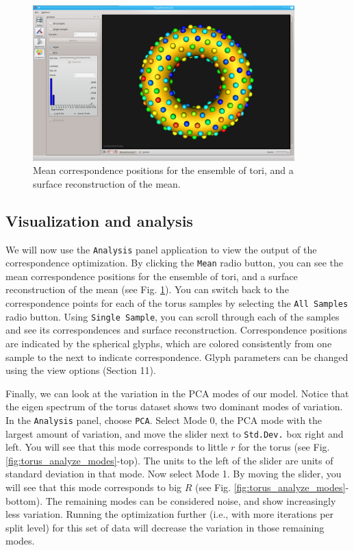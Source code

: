 \documentclass[letterpaper,12pt]{article}   %
\begin{document}
\begin{figure}[!htp]
	\centering
	\includegraphics[width=0.9\textwidth]{figs_v2/torus_analyze_mean.png}
	\caption{ Mean correspondence positions for the ensemble of tori, and a surface reconstruction of the mean. }
	\label{fig:torus_analyze_mean}
\end{figure}


\subsection{Visualization and analysis}

We will now use the \texttt{Analysis} panel application to view the output of the correspondence optimization. By clicking the \texttt{Mean} radio button, you can see the mean correspondence positions for the ensemble of tori, and a surface reconstruction of the mean (see Fig. \ref{fig:torus_analyze_mean}). You can switch back to the correspondence points for each of the torus samples by selecting the \texttt{All Samples} radio button. Using \texttt{Single Sample}, you can scroll through each of the samples and see its correspondences and surface reconstruction. Correspondence positions are indicated by the spherical glyphs, which are colored consistently from one sample to the next to indicate correspondence. Glyph parameters can be changed using the view options (Section 11). 

Finally, we can look at the variation in the PCA modes of our model. Notice that the eigen spectrum of the torus dataset shows two dominant modes of variation. In the \texttt{Analysis} panel, choose \texttt{PCA}. Select Mode 0, the PCA mode with the largest amount of variation, and move the slider next to \texttt{Std.Dev.} box right and left. You will see that this mode corresponds to little $r$ for the torus (see Fig. \ref{fig:torus_analyze_modes}-top). The units to the left of the slider are units of standard deviation in that mode. Now select Mode 1. By moving the slider, you will see that this mode corresponds to big $R$  (see Fig. \ref{fig:torus_analyze_modes}-bottom). The remaining modes can be considered noise, and show increasingly less variation. Running
the optimization further (i.e., with more iterations per split level) for this set of data will decrease the variation in those remaining modes.
\end{document}
